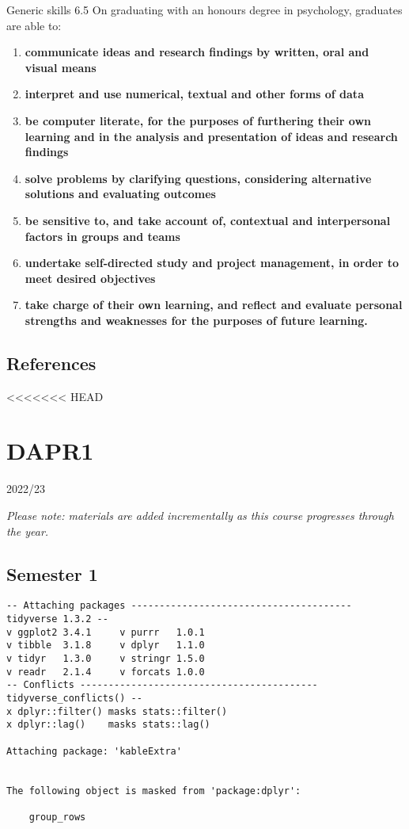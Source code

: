 \documentclass[
  11pt,
  letterpaper,
  oneside,
  open=any]{scrbook}
\begin{document}
Generic skills 6.5 On graduating with an honours degree in psychology,
graduates are able to:

\begin{enumerate}
\def\labelenumi{\arabic{enumi}.}
\item
  \textbf{communicate ideas and research findings by written, oral and
  visual means}
\item
  \textbf{interpret and use numerical, textual and other forms of data}
\item
  \textbf{be computer literate, for the purposes of furthering their own
  learning and in the analysis and presentation of ideas and research
  findings}
\item
  \textbf{solve problems by clarifying questions, considering
  alternative solutions and evaluating outcomes}
\item
  \textbf{be sensitive to, and take account of, contextual and
  interpersonal factors in groups and teams}
\item
  \textbf{undertake self-directed study and project management, in order
  to meet desired objectives}
\item
  \textbf{take charge of their own learning, and reflect and evaluate
  personal strengths and weaknesses for the purposes of future
  learning.}\\
\end{enumerate}

\hypertarget{references}{%
\section{References}\label{references}}

<<<<<<< HEAD

\hypertarget{dapr1}{%
\chapter{DAPR1}\label{dapr1}}

2022/23

\hfill\break

\emph{Please note: materials are added incrementally as this course
progresses through the year.}

\hypertarget{semester-1-1}{%
\section{Semester 1}\label{semester-1-1}}

\begin{verbatim}
-- Attaching packages --------------------------------------- tidyverse 1.3.2 --
v ggplot2 3.4.1     v purrr   1.0.1
v tibble  3.1.8     v dplyr   1.1.0
v tidyr   1.3.0     v stringr 1.5.0
v readr   2.1.4     v forcats 1.0.0
-- Conflicts ------------------------------------------ tidyverse_conflicts() --
x dplyr::filter() masks stats::filter()
x dplyr::lag()    masks stats::lag()

Attaching package: 'kableExtra'


The following object is masked from 'package:dplyr':

    group_rows
\end{verbatim}
\end{document}
